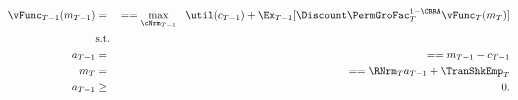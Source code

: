 \begin{equation*}\begin{gathered}\begin{aligned}
{\vFunc}_{T-1}({m}_{T-1})   & = &  =  = \max_{\cNrm_{T-1}} ~~ \util({c}_{T-1}) + \Ex_{T-1} [\Discount \PermGroFac_{T}^{1-\CRRA}{\vFunc}_{T}({m}_{T})] \label{eq:ConstrArt}
\\ & \mbox{s.t.}&  \nonumber
\\ {a}_{T-1}   & = &  =  = {m}_{T-1} - {c}_{T-1}
\\ {m}_{T}   & = &  =  = \RNrm_{T} {a}_{T-1} + \TranShkEmp_{T}
\\ {a}_{T-1} & \geq & 0 .
\end{aligned}\end{gathered}\end{equation*}
